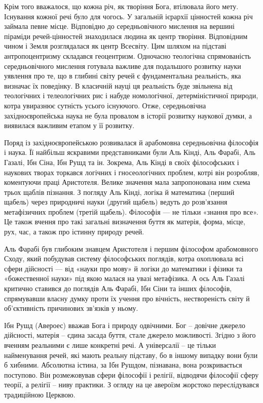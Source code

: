 Крім того вважалося, що кожна річ, як творіння Бога, втілювала його мету.
Існування кожної речі було для чогось. У загальній ієрархії цінностей кожна річ
займала певне місце. Відповідно до середньовічного мислення на вершині
піраміди речей-цінностей знаходилася людина як центр творіння. Відповідним
чином і Земля розглядалася як центр Всесвіту. Цим шляхом на підставі
антропоцентризму складався геоцентризм. Одночасно теологічна спрямованість
середньовічного мислення готувала важливе для подальшого розвитку науки
уявлення про те, що в глибині світу речей є фундаментальна реальність, яка
визначає їх поведінку. В класичній науці ця реальність буде звільнена від
теологічних і телеологічних рис і набуде номологічної, детерміністичної
природи, котра увиразнює сутність усього існуючого. Отже, середньовічна
західноєвропейська наука не була провалом в історії розвитку наукової думки, а
виявилася важливим етапом у її розвитку.
 
Поряд із західноєвропейською розвивалася й арабомовна середньовічна
філософія і наука. Її найбільш яскравими представниками були Аль Кінді, Аль
Фарабі, Аль Газалі, Ібн Сіна, Ібн Рушд та ін. Зокрема, Аль Кінді в своїх
філософських і наукових творах торкався логічних і гносеологічних проблем,
котрі він розробляв, коментуючи праці Аристотеля. Велике значення мала
запропонована ним схема трьох щаблів пізнання. З погляду Аль Кінді, логіка й
математика (перший щабель) через природничі науки (другий щабель) ведуть
до розв’язання метафізичних проблем (третій щабель). Філософія --- не тільки
«знання про все». Це також вчення про такі загальні визначення буття як
матерія, форма, місце, рух, час, а також про істинну природу речей.

Аль Фарабі був глибоким знавцем Аристотеля і першим філософом
арабомовного Сходу, який побудував систему філософських поглядів, котра
охоплювала всі сфери дійсності --- від «науки про мову» й логіки до математики
і фізики та «божественної науки» під якою малася на увазі метафізика. А ось
Аль Газалі критично ставився до поглядів Аль Фарабі, Ібн Сіни та інших
філософів, спрямувавши власну думку проти їх учення про вічність,
нествореність світу й об’єктивність причинових зв’язків у ньому.

Ібн Рушд (Авероес) вважав Бога і природу одвічними. Бог – довічне
джерело дійсності, матерія – єдина засада буття, стале джерело можливості.
Згідно з його вченням реальними є лише конкретні речі. А універсалії – це
тільки найменування речей, які мають реальну підставу, бо в іншому випадку
вони були б хибними. Абсолютна істина, за Ібн Рушдом, пізнавана, вона
розкривається поступово. Він розмежовував сфери філософії і релігії, відводячи
філософії сферу теорії, а релігії – ниву практики. З огляду на це авероїзм
жорстоко переслідувався традиційною Церквою.

